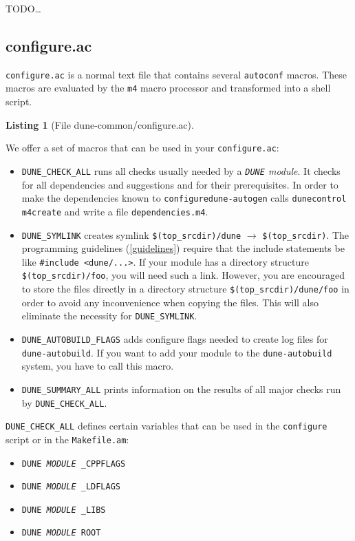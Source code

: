 \documentclass[11pt,a4paper,headinclude,footinclude,DIV16,normalheadings]{scrartcl}
\newtheorem{lst}{Listing}
\newcommand{\dune}{\texttt{DUNE}\xspace}
\newcommand{\autoconf}{\texttt{autoconf}\xspace}
\newcommand{\autogen}{\texttt{dune-autogen}\xspace}
\newcommand{\configure}{\texttt{configure}\xspace}
\newcommand{\configureac}{\texttt{configure.ac}\xspace}
\newcommand{\makefileam}{\texttt{Makefile.am}\xspace}
\newcommand{\topsrc}{\$(top\_srcdir)}
\begin{document}
TODO\dots{}

\subsection{configure.ac}
\label{configure.ac}

\configureac  is a normal text file that contains several \autoconf
macros. These macros are evaluated by the \texttt{m4} macro processor
and transformed into a shell script.

\begin{lst}[File dune-common/configure.ac] \mbox{}

\end{lst}

We offer a set of macros that can be used in your \configureac:

\begin{itemize}
\item \texttt{DUNE\_CHECK\_ALL}
  runs all checks usually needed by a {\em \dune module}.
  It checks for all dependencies and suggestions and for their
  prerequisites.
  In order to make the dependencies known to \configure \autogen calls
  \texttt{dunecontrol m4create} and write a file
  \texttt{dependencies.m4}.
\item \texttt{DUNE\_SYMLINK}
  creates symlink \texttt{\$(top\_srcdir)/dune} $\rightarrow$
  \texttt{\$(top\_srcdir)}. The programming guidelines (\ref{guidelines})
  require that the include statements be like \texttt{\#include
    <dune/...>}. If your module has a directory structure
  \texttt{\topsrc/foo}, you will need such a link. However, you are
  encouraged to store the files directly in a directory structure
  \texttt{\topsrc/dune/foo} in order to avoid any inconvenience when
  copying the files. This will also eliminate the necessity for
  \texttt{DUNE\_SYMLINK}.
\item \texttt{DUNE\_AUTOBUILD\_FLAGS}
  adds configure flags needed to create log files for
  \texttt{dune-autobuild}. If you want to add your module to the
  \texttt{dune-autobuild} system, you have to call this macro.
\item \texttt{DUNE\_SUMMARY\_ALL}
  prints information on the results of all major checks run by
  \texttt{DUNE\_CHECK\_ALL}.
\end{itemize}

\texttt{DUNE\_CHECK\_ALL} defines certain
variables that can be used in the \configure script or in the
\makefileam:

\begin{itemize}
\item \texttt{DUNE\textit{\,MODULE\,}\_CPPFLAGS}
\item \texttt{DUNE\textit{\,MODULE\,}\_LDFLAGS}
\item \texttt{DUNE\textit{\,MODULE\,}\_LIBS}
\item \texttt{DUNE\textit{\,MODULE\,}ROOT}
\end{itemize}
\end{document}
